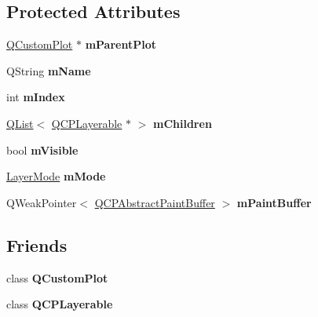 \subsection*{Protected Attributes}
\begin{DoxyCompactItemize}
\item 
\mbox{\label{class_q_c_p_layer_a7de89b11e56522c19439b4666194d3c4}} 
\hyperlink{class_q_custom_plot}{Q\+Custom\+Plot} $\ast$ {\bfseries m\+Parent\+Plot}
\item 
\mbox{\label{class_q_c_p_layer_a91e6298183cb4b9dfd4efdfaf1ecc220}} 
Q\+String {\bfseries m\+Name}
\item 
\mbox{\label{class_q_c_p_layer_a122088bcab6cec76a52b75ce8606605b}} 
int {\bfseries m\+Index}
\item 
\mbox{\label{class_q_c_p_layer_a0b32189cc98d488d6649731e9c2a6089}} 
\hyperlink{class_q_list}{Q\+List}$<$ \hyperlink{class_q_c_p_layerable}{Q\+C\+P\+Layerable} $\ast$ $>$ {\bfseries m\+Children}
\item 
\mbox{\label{class_q_c_p_layer_a264950deb08e589460c126c895a1e2b5}} 
bool {\bfseries m\+Visible}
\item 
\mbox{\label{class_q_c_p_layer_a11bd0aa190d8fa21c8c7673d070737c8}} 
\hyperlink{class_q_c_p_layer_a67dcfc1590be2a1f2227c5a39bb59c7c}{Layer\+Mode} {\bfseries m\+Mode}
\item 
\mbox{\label{class_q_c_p_layer_aa99de922c03144a50f7bf280095c8b4f}} 
Q\+Weak\+Pointer$<$ \hyperlink{class_q_c_p_abstract_paint_buffer}{Q\+C\+P\+Abstract\+Paint\+Buffer} $>$ {\bfseries m\+Paint\+Buffer}
\end{DoxyCompactItemize}
\subsection*{Friends}
\begin{DoxyCompactItemize}
\item 
\mbox{\label{class_q_c_p_layer_a00f8b42d059625f815808a7cc99c2f04}} 
class {\bfseries Q\+Custom\+Plot}
\item 
\mbox{\label{class_q_c_p_layer_a1fd64e85b6acdaf9c09c904817e2162c}} 
class {\bfseries Q\+C\+P\+Layerable}
\end{DoxyCompactItemize}


